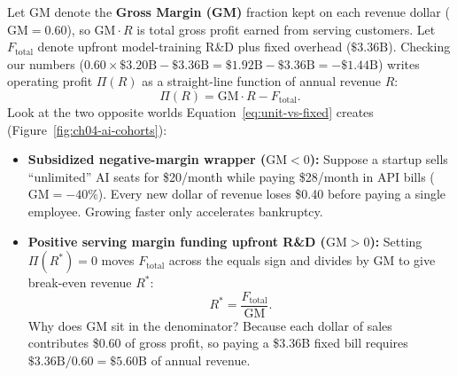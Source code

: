 Let $\text{GM}$ denote the \textbf{Gross Margin (GM)} fraction kept on each revenue dollar ($\text{GM} = 0.60$), so $\text{GM} \cdot R$ is total gross profit earned from serving customers. Let $F_{\text{total}}$ denote upfront model-training R\&D plus fixed overhead ($\$3.36\text{B}$). Checking our numbers ($0.60 \times \$3.20\text{B} - \$3.36\text{B} = \$1.92\text{B} - \$3.36\text{B} = -\$1.44\text{B}$) writes operating profit $\Pi(R)$ as a straight-line function of annual revenue $R$:
\begin{equation}
  \Pi(R) = \text{GM} \cdot R - F_{\text{total}}.
  \label{eq:unit-vs-fixed}
\end{equation}
Look at the two opposite worlds Equation~\eqref{eq:unit-vs-fixed} creates (Figure~\ref{fig:ch04-ai-cohorts}):
\begin{itemize}
  \item \textbf{Subsidized negative-margin wrapper ($\text{GM} < 0$):} Suppose a startup sells ``unlimited'' AI seats for \$20/month while paying \$28/month in API bills ($\text{GM} = -40\%$). Every new dollar of revenue loses \$0.40 before paying a single employee. Growing faster only accelerates bankruptcy.
  \item \textbf{Positive serving margin funding upfront R\&D ($\text{GM} > 0$):} Setting $\Pi(R^*) = 0$ moves $F_{\text{total}}$ across the equals sign and divides by $\text{GM}$ to give break-even revenue $R^*$:
  \begin{equation}
    R^* = \frac{F_{\text{total}}}{\text{GM}}.
    \label{eq:breakeven-scale}
  \end{equation}
  Why does $\text{GM}$ sit in the denominator? Because each dollar of sales contributes \$0.60 of gross profit, so paying a \$3.36B fixed bill requires $\$3.36\text{B} / 0.60 = \$5.60\text{B}$ of annual revenue.
\end{itemize}

